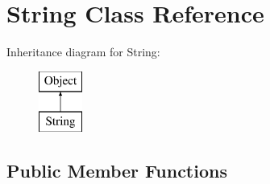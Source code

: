 \hypertarget{class_string}{
\section{String Class Reference}
\label{class_string}
}
Inheritance diagram for String:\begin{figure}[H]
\begin{center}
\leavevmode
\includegraphics[height=2.000000cm]{class_string}
\end{center}
\end{figure}
\subsection*{Public Member Functions}
